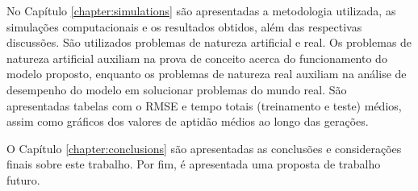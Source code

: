 No Capítulo \ref{chapter:simulations} são apresentadas a metodologia utilizada, as simulações computacionais e os resultados obtidos, além das respectivas discussões. São utilizados problemas de natureza artificial e real. Os problemas de natureza artificial auxiliam na prova de conceito acerca do funcionamento do modelo proposto, enquanto os problemas de natureza real auxiliam na análise de desempenho do modelo em solucionar problemas do mundo real. São apresentadas tabelas com o RMSE e tempo totais (treinamento e teste) médios, assim como gráficos dos valores de aptidão médios ao longo das gerações.

O Capítulo \ref{chapter:conclusions} são apresentadas as conclusões e considerações finais sobre este trabalho. Por fim, é apresentada uma proposta de trabalho futuro.